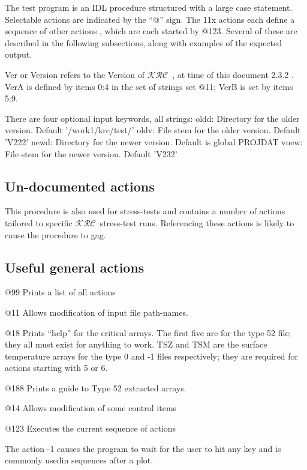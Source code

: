 \documentclass{article}  %
\newcommand{\krc}{$\mathcal{KRC}$~}    %
\begin{document}
The test program is an IDL procedure structured with a large case
statement. Selectable actions are indicated by the ``@'' sign. The 11x actions
each define a sequence of other actions , which are each started by
@123. Several of these are described in the following subsections, along with examples of the expected output.

Ver or Version refers to the Version of \krc, at time of this document 2.3.2 .
 VerA is defined by items 0:4 in the set of strings set @11; VerB is set by items 5:9.


There are four optional input keywords, all strings:
\qi oldd:    Directory for the older version.  Default '/work1/krc/test/'
\qi oldv: File stem for the older version. Default 'V222'
\qi newd: Directory for the newer version. Default is global PROJDAT
\qi vnew: File stem for the newer version. Default 'V232'

\subsection{Un-documented actions}
This procedure is also used for stress-tests and contains a number of actions tailored to specific \krc stress-test runs. Referencing these actions is likely to cause the procedure to gag.
  
\subsection{ Useful general actions}

@99 Prints a list of all actions

@11 Allows modification of input file path-names.

@18 Prints ``help''  for the critical arrays. The first five are for the type 52 file; they all must exist for anything to work.  TSZ and TSM are the surface temperature arrays for the type 0 and -1 files respectively; they are required for actions starting with 5 or 6.

@188 Prints a guide to Type 52 extracted arrays.

@14  Allows modification of some control items

@123 Executes the current sequence of actions 

The action -1 causes the program to wait for the user to hit any key and is commonly usedin sequences after a plot.
\end{document}
